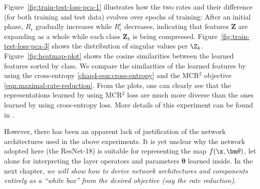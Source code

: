 \documentclass[../../book-main.tex]{subfiles}
\begin{document}
\begin{example}
	Figure~\ref{fig:train-test-loss-pca-1} illustrates how the two rates and their difference (for both training and test data) evolves over epochs of training: After an initial phase, $R_\epsilon$ gradually increases while $R^c_\epsilon$ decreases, indicating that features $\bm Z$ are expanding as a whole while each class $\bm Z_k$ is being compressed.
	Figure~\ref{fig:train-test-loss-pca-3} shows the distribution of singular values per $\Z_k$.  Figure~\ref{fig:heatmap-plot} shows the cosine similarities between the learned features sorted by class. We compare the similarities of the learned features by using the cross-entropy \eqref{chap4-eqn:cross-entropy} and the MCR$^2$ objective \eqref{eqn:maximal-rate-reduction}. From the plots, one can clearly see that the representations learned by using MCR$^2$ loss are much more diverse than the ones learned by using cross-entropy loss. More details of this experiment can be found in \cite{chan2021redunet}.
	\label{eg:Rate-Reduction-CIFAR10}
\end{example}


However, there has been an apparent lack of justification of the network architectures used in the above experiments. It is yet unclear why the network adopted here (the ResNet-18) is suitable for representing the map $f(\x, \bm \theta)$, let alone for interpreting the layer operators and parameters $\bm \theta$ learned inside. In the next chapter, {\em we will show how to derive network architectures and components entirely as a ``white box'' from the desired objective (say the rate reduction)}.
\end{document}
